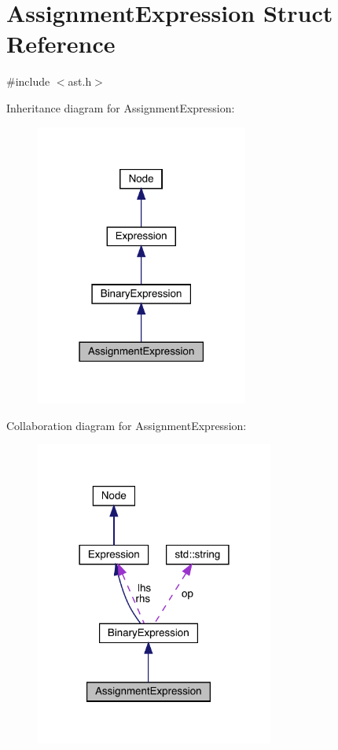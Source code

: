 \hypertarget{struct_assignment_expression}{}\section{Assignment\+Expression Struct Reference}
\label{struct_assignment_expression}


{\ttfamily \#include $<$ast.\+h$>$}



Inheritance diagram for Assignment\+Expression\+:\nopagebreak
\begin{figure}[H]
\begin{center}
\leavevmode
\includegraphics[width=198pt]{struct_assignment_expression__inherit__graph}
\end{center}
\end{figure}


Collaboration diagram for Assignment\+Expression\+:\nopagebreak
\begin{figure}[H]
\begin{center}
\leavevmode
\includegraphics[width=222pt]{struct_assignment_expression__coll__graph}
\end{center}
\end{figure}
